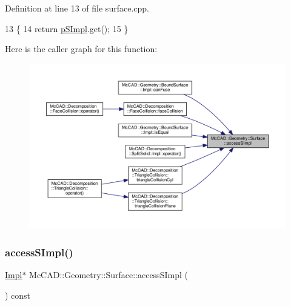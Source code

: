 Definition at line 13 of file surface.\+cpp.


\begin{DoxyCode}
13                                        \{
14   \textcolor{keywordflow}{return} \hyperlink{classMcCAD_1_1Geometry_1_1Surface_a0097d4e9bfc1c7cd7cd33d81492b9100}{pSImpl}.get();
15 \}
\end{DoxyCode}
Here is the caller graph for this function\+:\nopagebreak
\begin{figure}[H]
\begin{center}
\leavevmode
\includegraphics[width=350pt]{d1/d2b/classMcCAD_1_1Geometry_1_1Surface_a989de1f9ebe3de043412014ed25e52eb_icgraph}
\end{center}
\end{figure}
\mbox{\label{classMcCAD_1_1Geometry_1_1Surface_adafee834670eb8c97025e24ffd6df844}} 
\subsubsection{\texorpdfstring{access\+S\+Impl()}{accessSImpl()}\hspace{0.1cm}{\footnotesize\ttfamily [2/2]}}
{\footnotesize\ttfamily \hyperlink{classMcCAD_1_1Geometry_1_1BoundSurfaceCyl_1_1Impl}{Impl}$\ast$ Mc\+C\+A\+D\+::\+Geometry\+::\+Surface\+::access\+S\+Impl (\begin{DoxyParamCaption}{ }\end{DoxyParamCaption}) const\hspace{0.3cm}{\ttfamily [inherited]}}

